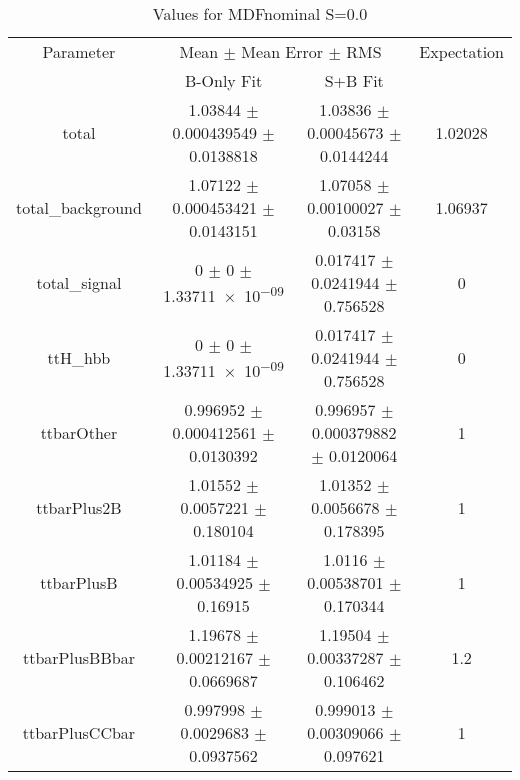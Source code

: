 \begin{table}
\centering
\caption{Values for MDFnominal S=0.0}
\begin{tabular}{cccc}
\toprule
Parameter & \multicolumn{2}{c}{Mean $\pm$ Mean Error $\pm$ RMS} & Expectation\\
 & B-Only Fit & S+B Fit & \\
\midrule
total & \num{1.03844} $\pm$ \num{0.000439549} $\pm$ \num{0.0138818} & \num{1.03836} $\pm$ \num{0.00045673} $\pm$ \num{0.0144244} & \num{1.02028}\\
total\_background & \num{1.07122} $\pm$ \num{0.000453421} $\pm$ \num{0.0143151} & \num{1.07058} $\pm$ \num{0.00100027} $\pm$ \num{0.03158} & \num{1.06937}\\
total\_signal & \num{0} $\pm$ \num{0} $\pm$ \num{1.33711e-09} & \num{0.017417} $\pm$ \num{0.0241944} $\pm$ \num{0.756528} & \num{0}\\
ttH\_hbb & \num{0} $\pm$ \num{0} $\pm$ \num{1.33711e-09} & \num{0.017417} $\pm$ \num{0.0241944} $\pm$ \num{0.756528} & \num{0}\\
ttbarOther & \num{0.996952} $\pm$ \num{0.000412561} $\pm$ \num{0.0130392} & \num{0.996957} $\pm$ \num{0.000379882} $\pm$ \num{0.0120064} & \num{1}\\
ttbarPlus2B & \num{1.01552} $\pm$ \num{0.0057221} $\pm$ \num{0.180104} & \num{1.01352} $\pm$ \num{0.0056678} $\pm$ \num{0.178395} & \num{1}\\
ttbarPlusB & \num{1.01184} $\pm$ \num{0.00534925} $\pm$ \num{0.16915} & \num{1.0116} $\pm$ \num{0.00538701} $\pm$ \num{0.170344} & \num{1}\\
ttbarPlusBBbar & \num{1.19678} $\pm$ \num{0.00212167} $\pm$ \num{0.0669687} & \num{1.19504} $\pm$ \num{0.00337287} $\pm$ \num{0.106462} & \num{1.2}\\
ttbarPlusCCbar & \num{0.997998} $\pm$ \num{0.0029683} $\pm$ \num{0.0937562} & \num{0.999013} $\pm$ \num{0.00309066} $\pm$ \num{0.097621} & \num{1}\\
\bottomrule
\end{tabular}
\end{table}